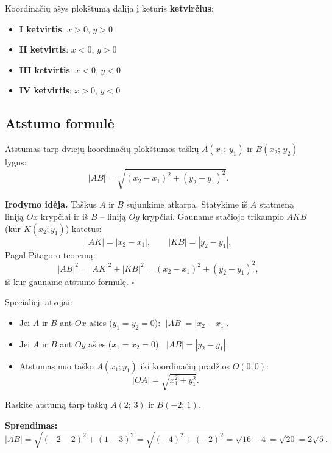 Koordinačių ašys plokštumą dalija į keturis \textbf{ketvirčius}:
\begin{itemize}
    \item \textbf{I ketvirtis}: $x > 0$, $y > 0$
    \item \textbf{II ketvirtis}: $x < 0$, $y > 0$
    \item \textbf{III ketvirtis}: $x < 0$, $y < 0$
    \item \textbf{IV ketvirtis}: $x > 0$, $y < 0$
\end{itemize}

\subsection{Atstumo formulė}

\begin{definition}
Atstumas tarp dviejų koordinačių plokštumos taškų $A(x_1;\, y_1)$ ir $B(x_2;\, y_2)$ lygus:
\[
    |AB| = \sqrt{(x_2 - x_1)^2 + (y_2 - y_1)^2}.
\]
\end{definition}

\textbf{Įrodymo idėja.} Taškus $A$ ir $B$ sujunkime atkarpa. Statykime iš $A$ statmeną liniją $Ox$ krypčiai ir iš $B$ – liniją $Oy$ krypčiai. Gauname stačiojo trikampio $AKB$ (kur $K(x_2; y_1)$) katetus:
\[
    |AK| = |x_2 - x_1|, \qquad |KB| = |y_2 - y_1|.
\]
Pagal Pitagoro teoremą:
\[
    |AB|^2 = |AK|^2 + |KB|^2 = (x_2 - x_1)^2 + (y_2 - y_1)^2,
\]
iš kur gauname atstumo formulę. $\square$

\begin{remark}
Specialieji atvejai:
\begin{itemize}
    \item Jei $A$ ir $B$ ant $Ox$ ašies ($y_1 = y_2 = 0$): $\;|AB| = |x_2 - x_1|$.
    \item Jei $A$ ir $B$ ant $Oy$ ašies ($x_1 = x_2 = 0$): $\;|AB| = |y_2 - y_1|$.
    \item Atstumas nuo taško $A(x_1; y_1)$ iki koordinačių pradžios $O(0;0)$:
    \[
        |OA| = \sqrt{x_1^2 + y_1^2}.
    \]
\end{itemize}
\end{remark}

\begin{example}
Raskite atstumą tarp taškų $A(2;\, 3)$ ir $B(-2;\, 1)$.

\textbf{Sprendimas:}
\[
    |AB| = \sqrt{(-2-2)^2 + (1-3)^2} = \sqrt{(-4)^2 + (-2)^2} = \sqrt{16 + 4} = \sqrt{20} = 2\sqrt{5}.
\]
\end{example}

